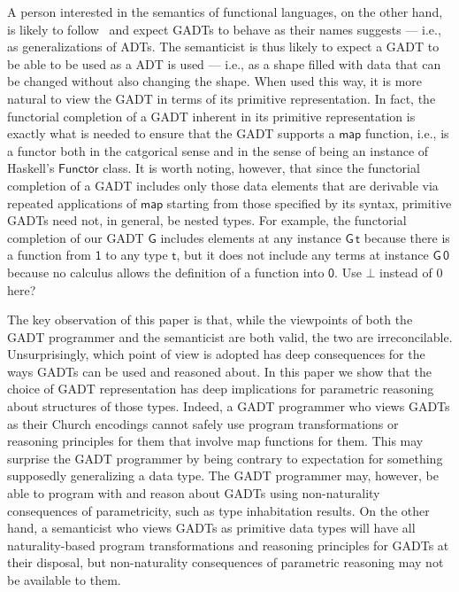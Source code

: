 \documentclass[acmsmall,screen,review,anonymous]{acmart}
\theoremstyle{definition}
\begin{document}
A person interested in the semantics of functional languages, on the
other hand, is likely to follow~\cite{bfss90} and expect GADTs to
behave as their names suggests --- i.e., as generalizations of
ADTs. The semanticist is thus likely to expect a GADT to be able to be
used as a ADT is used --- i.e., as a shape filled with data that can
be changed without also changing the shape. When used this way, it is
more natural to view the GADT in terms of its primitive
representation. In fact, the functorial completion of a GADT inherent
in its primitive representation is exactly what is needed to ensure
that the GADT supports a $\mathsf{map}$ function, i.e., is a functor
both in the catgorical sense and in the sense of being an instance of
Haskell's $\mathsf{Functor}$ class.  It is worth noting, however, that
since the functorial completion of a GADT includes only those data
elements that are derivable via repeated applications of
$\mathsf{map}$ starting from those specified by its syntax, primitive
GADTs need not, in general, be nested types. For example, the
functorial completion of our GADT $\mathsf{G}$ includes elements at
any instance $\mathsf{G\,t}$ because there is a function from
$\mathsf{1}$ to any type $\mathsf{t}$, but it does not include any
terms at instance $\mathsf{G\,0}$ because no calculus allows the
definition of a function into $\mathsf{0}$. {\color{blue} Use $\bot$
  instead of $0$ here?}

The key observation of this paper is that, while the viewpoints of
both the GADT programmer and the semanticist are both valid, the two
are irreconcilable. Unsurprisingly, which point of view is adopted has
deep consequences for the ways GADTs can be used and reasoned
about. In this paper we show that the choice of GADT representation
has deep implications for parametric reasoning about structures of
those types. Indeed, a GADT programmer who views GADTs as their Church
encodings cannot safely use program transformations or reasoning
principles for them that involve map functions for them. This may
surprise the GADT programmer by being contrary to expectation for
something supposedly generalizing a data type. The GADT programmer
may, however, be able to program with and reason about GADTs using
non-naturality consequences of parametricity, such as type
inhabitation results. On the other hand, a semanticist who views GADTs
as primitive data types will have all naturality-based program
transformations and reasoning principles for GADTs at their disposal,
but non-naturality consequences of parametric reasoning may not be
available to them.
\end{document}
